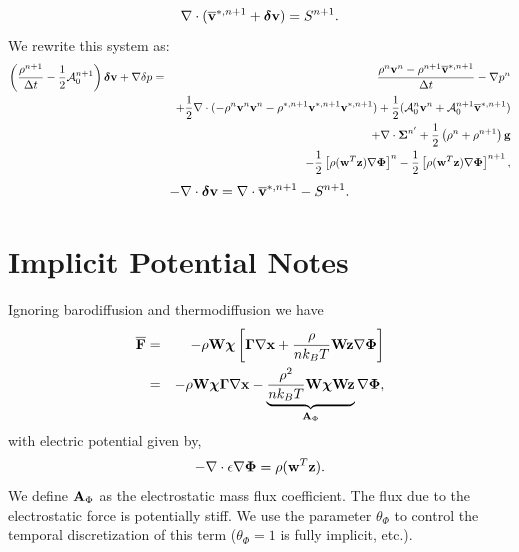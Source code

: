 \documentclass[final]{siamltex}
\def\Ab {{\bf A}}
\def\Fb {{\bf F}}
\def\gb {{\bf g}}
\def\vb {{\bf v}}
\def\wb {{\bf w}}
\def\Wb {{\bf W}}
\def\xb {{\bf x}}
\def\zb {{\bf z}}
\def\chib   {\boldsymbol{\chi}}
\def\deltab {\boldsymbol{\delta}}
\def\Gammab {\boldsymbol{\Gamma}}
\def\Phib   {\boldsymbol{\Phi}}
\def\Sigmab {\boldsymbol{\Sigma}}
\def\half   {\frac{1}{2}}
\begin{document}
\begin{equation}
\nabla\cdot(\overline\vb^{*,n+1} + \deltab\vb) = S^{n+1}.
\end{equation}
We rewrite this system as:
\begin{eqnarray}
\left(\frac{\rho^{n+1}}{\Delta t} - \half\mathcal{A}_0^{n+1}\right)\deltab\vb + \nabla\delta p &=& \frac{\rho^n\vb^n-\rho^{n+1}\overline\vb^{*,n+1}}{\Delta t} -\nabla p^n\nonumber\\
&&+ \half\nabla\cdot(-\rho^n\vb^n\vb^n - \rho^{*,n+1}\vb^{*,n+1}\vb^{*,n+1}) + \half(\mathcal{A}_0^n\vb^n + \mathcal{A}_0^{n+1}\overline\vb^{*,n+1} )\nonumber\\
&&+ \nabla\cdot\Sigmab^{n'} + \half\left(\rho^n+\rho^{n+1}\right)\gb\nonumber\\
&&- \half\left[\rho(\wb^T\zb)\nabla\Phib\right]^n - \half\left[\rho(\wb^T\zb)\nabla\Phib\right]^{n+1},
\end{eqnarray}
\begin{equation}
-\nabla\cdot\deltab\vb = \nabla\cdot\overline\vb^{*,n+1} - S^{n+1}.
\end{equation}

\section{Implicit Potential Notes}
Ignoring barodiffusion and thermodiffusion we have
\begin{eqnarray}
\overline{\Fb} &=& -\rho\Wb\chib\left[\Gammab\nabla\xb + \frac{\rho}{n k_B T}\Wb\zb\nabla\Phib\right]\nonumber\\
&=& -\rho\Wb\chib\Gammab\nabla\xb - \underbrace{\frac{\rho^2}{nk_B T}\Wb\chib\Wb\zb}_{\Ab_\Phi}\nabla\Phib,
\end{eqnarray}
with electric potential given by,
\begin{equation}
-\nabla\cdot\epsilon\nabla\Phib = \rho(\wb^T\zb).
\end{equation}
We define $\Ab_\Phi$ as the electrostatic mass flux coefficient.
The flux due to the electrostatic force is potentially stiff.  We
use the parameter $\theta_\Phi$ to control the temporal discretization of this term
($\theta_\Phi=1$ is fully implicit, etc.).
\end{document}
